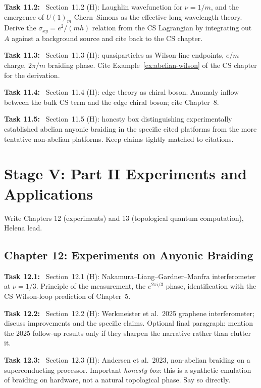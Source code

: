\documentclass[11pt]{article}
\newcommand{\task}[1]{\medskip\noindent\textbf{Task #1:}\ }
\begin{document}
\task{11.2} Section~11.2 (H): Laughlin wavefunction for $\nu = 1/m$, and the emergence
of $U(1)_m$ Chern--Simons as the effective long-wavelength theory. Derive the
$\sigma_{xy} = e^2/(mh)$ relation from the CS Lagrangian by integrating out $A$ against
a background source and cite back to the CS chapter.

\task{11.3} Section~11.3 (H): quasiparticles as Wilson-line endpoints, $e/m$ charge,
$2\pi/m$ braiding phase. Cite Example~\ref{ex:abelian-wilson} of the CS chapter for
the derivation.

\task{11.4} Section~11.4 (H): edge theory as chiral boson. Anomaly inflow between the
bulk CS term and the edge chiral boson; cite Chapter~8.

\task{11.5} Section~11.5 (H): honesty box distinguishing experimentally established
abelian anyonic braiding in the specific cited platforms from the more tentative
non-abelian platforms. Keep claims tightly matched to citations.

\section{Stage V: Part II Experiments and Applications}\label{sec:stageV}

\begin{goalbox}[Objective]
Write Chapters 12 (experiments) and 13 (topological quantum computation), Helena lead.
\end{goalbox}

\subsection{Chapter 12: Experiments on Anyonic Braiding}

\task{12.1} Section~12.1 (H): Nakamura--Liang--Gardner--Manfra \cite{Nakamura2020}
interferometer at $\nu=1/3$. Principle of the measurement, the $e^{2\pi i/3}$ phase,
identification with the CS Wilson-loop prediction of Chapter~5.

\task{12.2} Section~12.2 (H): Werkmeister et al.\ 2025 graphene interferometer; discuss
improvements and the specific claims. Optional final paragraph: mention the 2025 follow-up
results only if they sharpen the narrative rather than clutter it.

\task{12.3} Section~12.3 (H): Andersen et al.\ 2023, non-abelian braiding on a
superconducting processor. Important \emph{honesty box}: this is a synthetic
emulation of braiding on hardware, not a natural topological phase. Say so directly.
\end{document}
